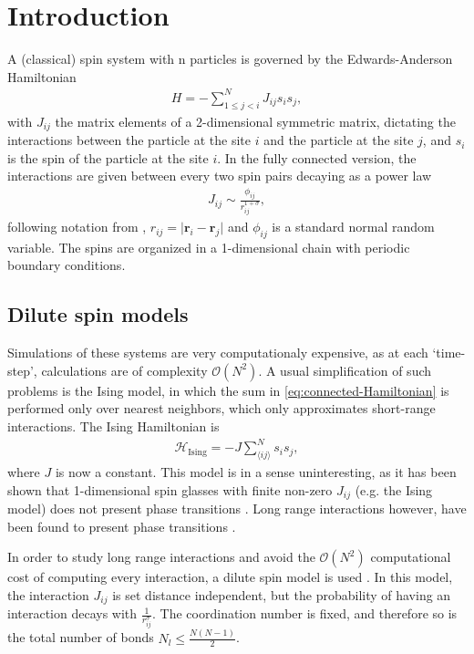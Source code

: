 \section{Introduction}
A (classical) spin system with n particles is governed by the Edwards-Anderson Hamiltonian 
\begin{align}
	H = -\sum^N_{1\le j < i} J_{ij} s_i s_j,
	\label{eq:connected-Hamiltonian}
\end{align}
with $J_{ij}$ the matrix elements of a 2-dimensional symmetric matrix, dictating the interactions between the particle at the site $i$ and the particle at the site $j$, and $s_i$ is the spin of the particle at the site $i$.
In the fully connected version, the interactions are given between every two spin pairs decaying as a power law 
\begin{align}
	J_{ij} \sim \frac{\phi_{ij}}{r^{1+\sigma}_{ij}},
\end{align}
following notation from \cite{Beyer2012}, $r_{ij} = \lvert \textbf{r}_i - \textbf{r}_j\rvert$ and $\phi_{ij}$ is a standard normal random variable. The spins are organized in a 1-dimensional chain with periodic boundary conditions.

\subsection{Dilute spin models}
Simulations of these systems are very computationaly expensive, as at each `time-step', calculations are of complexity $\mathcal{O}(N^2)$. 
	A usual simplification of such problems is the Ising model, in which the sum in \eqref{eq:connected-Hamiltonian} is performed only over nearest neighbors, which only approximates short-range interactions. The Ising Hamiltonian is \cite{Luijten2006} 
\begin{align*}
	\mathcal{H}_{\text{Ising}} = - J \sum_{\langle ij \rangle}^{N} s_i s_j
,\end{align*}
where $J$ is now a constant.
This model is in a sense uninteresting, as it has been shown that 1-dimensional spin glasses with finite non-zero $J_{ij}$ (e.g. the Ising model) does not present phase transitions \cite{Rushbrooke_Ursell_1948}. Long range interactions however, have been found to present phase transitions \cite{Kotliar1983}.

In order to study long range interactions and avoid the $\mathcal{O}(N^2)$ computational cost of computing every interaction, a dilute spin model is used \cite{Leuzzi2008}.
In this model, the interaction $J_{ij}$ is set distance independent, but the probability of having an interaction decays with $
	\frac{1}{r^\sigma_{ij}}.$ The coordination number is fixed, and therefore so is the total number of bonds $N_l \leq \frac{N(N-1)}{2}$.
